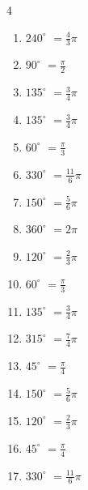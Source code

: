 \begin{multicols}{4}
\begin{enumerate}
  \item $\displaystyle 240^{\circ}$
        $\displaystyle =\frac{4}{3}\pi$

  \item $\displaystyle 90^{\circ}$
        $\displaystyle =\frac{\pi}{2}$

  \item $\displaystyle 135^{\circ}$
        $\displaystyle =\frac{3}{4}\pi$

  \item $\displaystyle 135^{\circ}$
        $\displaystyle =\frac{3}{4}\pi$

  \item $\displaystyle 60^{\circ}$
        $\displaystyle =\frac{\pi}{3}$

  \item $\displaystyle 330^{\circ}$
        $\displaystyle =\frac{11}{6}\pi$

  \item $\displaystyle 150^{\circ}$
        $\displaystyle =\frac{5}{6}\pi$

  \item $\displaystyle 360^{\circ}$
        $\displaystyle =2\pi$

  \item $\displaystyle 120^{\circ}$
        $\displaystyle =\frac{2}{3}\pi$

  \item $\displaystyle 60^{\circ}$
        $\displaystyle =\frac{\pi}{3}$

  \item $\displaystyle 135^{\circ}$
        $\displaystyle =\frac{3}{4}\pi$

  \item $\displaystyle 315^{\circ}$
        $\displaystyle =\frac{7}{4}\pi$

  \item $\displaystyle 45^{\circ}$
        $\displaystyle =\frac{\pi}{4}$

  \item $\displaystyle 150^{\circ}$
        $\displaystyle =\frac{5}{6}\pi$

  \item $\displaystyle 120^{\circ}$
        $\displaystyle =\frac{2}{3}\pi$

  \item $\displaystyle 45^{\circ}$
        $\displaystyle =\frac{\pi}{4}$

  \item $\displaystyle 330^{\circ}$
        $\displaystyle =\frac{11}{6}\pi$


\end{enumerate}
\end{multicols}
